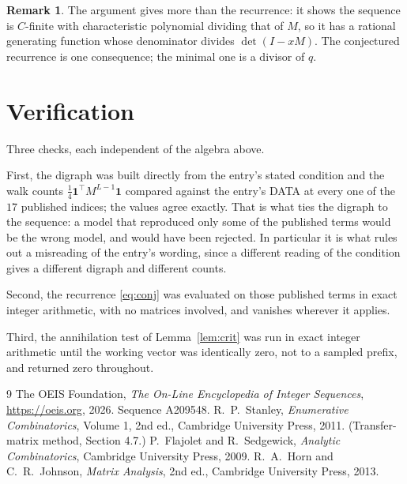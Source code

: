 \documentclass[11pt,a4paper]{article}
\theoremstyle{plain}
\theoremstyle{definition}
\newtheorem{remark}[theorem]{Remark}
\begin{document}
\begin{remark}
The argument gives more than the recurrence: it shows the sequence is $C$-finite with
characteristic polynomial dividing that of $M$, so it has a rational generating function
whose denominator divides $\det(I-xM)$. The conjectured recurrence is one consequence; the
minimal one is a divisor of $q$.
\end{remark}

\section{Verification}

Three checks, each independent of the algebra above.

First, the digraph was built directly from the entry's stated condition and the walk counts
$\tfrac1{4}\mathbf{1}^{\!\top}M^{L-1}\mathbf{1}$ compared against the entry's DATA at
every one of the $17$ published indices; the values agree exactly. That is what ties
the digraph to the sequence: a model that reproduced only some of the published terms would
be the wrong model, and would have been rejected. In particular it is what rules out a
misreading of the entry's wording, since a different reading of the condition gives a
different digraph and different counts.

Second, the recurrence \eqref{eq:conj} was evaluated on those published terms in exact
integer arithmetic, with no matrices involved, and vanishes wherever it applies.

Third, the annihilation test of Lemma~\ref{lem:crit} was run in exact integer arithmetic
until the working vector was identically zero, not to a sampled prefix, and returned zero
throughout.

\begin{thebibliography}{9}
 The OEIS Foundation, \emph{The On-Line Encyclopedia of Integer
Sequences}, \url{https://oeis.org}, 2026. Sequence A209548.
 R.~P.~Stanley, \emph{Enumerative Combinatorics}, Volume 1, 2nd ed.,
Cambridge University Press, 2011. (Transfer-matrix method, Section 4.7.)
 P.~Flajolet and R.~Sedgewick, \emph{Analytic Combinatorics}, Cambridge
University Press, 2009.
 R.~A.~Horn and C.~R.~Johnson, \emph{Matrix Analysis}, 2nd ed., Cambridge
University Press, 2013.
\end{thebibliography}
\end{document}
